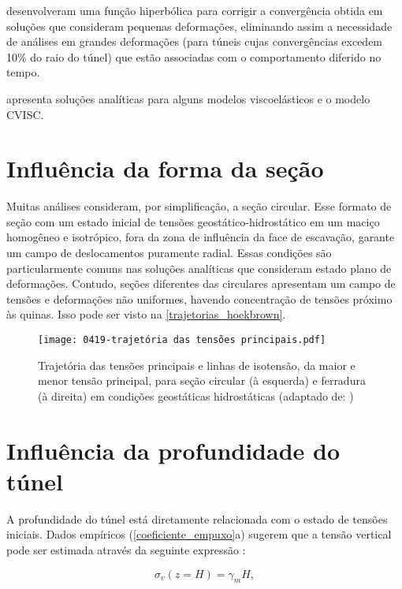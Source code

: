\textbf{} desenvolveram uma função hiperbólica para corrigir a convergência obtida em soluções que consideram pequenas deformações, eliminando assim a necessidade de análises em grandes deformações (para túneis cujas convergências excedem 10\% do raio do túnel) que estão associadas com o comportamento diferido no tempo.

\textbf{} apresenta soluções analíticas para alguns modelos viscoelásticos e o modelo CVISC.

\section{Influência da forma da seção}

Muitas análises consideram, por simplificação, a seção circular. Esse formato de seção com um estado inicial de tensões geostático-hidrostático em um maciço homogêneo e isotrópico, fora da zona de influência da face de escavação, garante um campo de deslocamentos puramente radial. Essas condições são particularmente comuns nas soluções analíticas que consideram estado plano de deformações. Contudo, seções diferentes das circulares apresentam um campo de tensões e deformações não uniformes, havendo concentração de tensões próximo às quinas. Isso pode ser visto na \autoref{trajetorias_hoekbrown}.

\begin{figure}[H]
	\begin{center}
		\texttt{[image: 0419-trajetória das tensões principais.pdf]}
	\end{center}
	\caption{\label{trajetorias_hoekbrown}Trajetória das tensões principais e linhas de isotensão, da maior e menor tensão principal, para seção circular (à esquerda) e ferradura (à direita) em condições geostáticas hidrostáticas (adaptado de: )}
\end{figure}

\section{Influência da profundidade do túnel}

A profundidade do túnel está diretamente relacionada com o estado de tensões iniciais. Dados empíricos (\autoref{coeficiente_empuxo}a) sugerem que a tensão vertical pode ser estimada através da seguinte expressão \cite[p. 96]{Hoek1980}:

\begin{equation}
	\sigma_v(z=H)= \gamma_m H ,
\end{equation}

